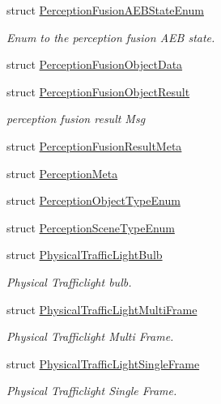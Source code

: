 \begin{DoxyCompactItemize}
struct \hyperlink{structmaf__perception__interface_1_1PerceptionFusionAEBStateEnum}{Perception\+Fusion\+A\+E\+B\+State\+Enum}
\begin{DoxyCompactList}\small\item\em Enum to the perception fusion A\+EB state. \end{DoxyCompactList}\item 
struct \hyperlink{structmaf__perception__interface_1_1PerceptionFusionObjectData}{Perception\+Fusion\+Object\+Data}
\item 
struct \hyperlink{structmaf__perception__interface_1_1PerceptionFusionObjectResult}{Perception\+Fusion\+Object\+Result}
\begin{DoxyCompactList}\small\item\em perception fusion result Msg \end{DoxyCompactList}\item 
struct \hyperlink{structmaf__perception__interface_1_1PerceptionFusionResultMeta}{Perception\+Fusion\+Result\+Meta}
\item 
struct \hyperlink{structmaf__perception__interface_1_1PerceptionMeta}{Perception\+Meta}
\item 
struct \hyperlink{structmaf__perception__interface_1_1PerceptionObjectTypeEnum}{Perception\+Object\+Type\+Enum}
\item 
struct \hyperlink{structmaf__perception__interface_1_1PerceptionSceneTypeEnum}{Perception\+Scene\+Type\+Enum}
\item 
struct \hyperlink{structmaf__perception__interface_1_1PhysicalTrafficLightBulb}{Physical\+Traffic\+Light\+Bulb}
\begin{DoxyCompactList}\small\item\em Physical Trafficlight bulb. \end{DoxyCompactList}\item 
struct \hyperlink{structmaf__perception__interface_1_1PhysicalTrafficLightMultiFrame}{Physical\+Traffic\+Light\+Multi\+Frame}
\begin{DoxyCompactList}\small\item\em Physical Trafficlight Multi Frame. \end{DoxyCompactList}\item 
struct \hyperlink{structmaf__perception__interface_1_1PhysicalTrafficLightSingleFrame}{Physical\+Traffic\+Light\+Single\+Frame}
\begin{DoxyCompactList}\small\item\em Physical Trafficlight Single Frame. \end{DoxyCompactList}\item 

\end{DoxyCompactItemize}
